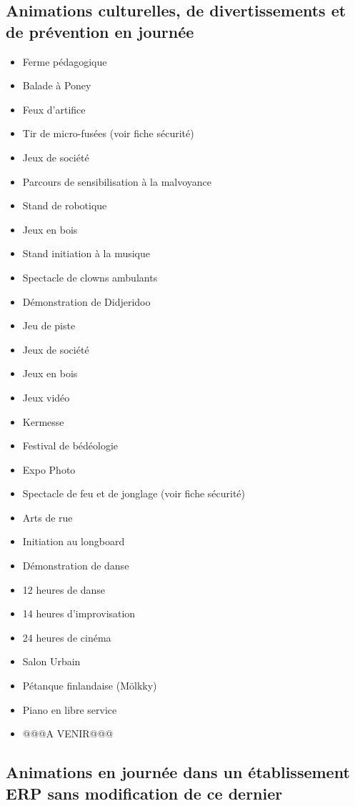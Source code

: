 \documentclass[hidelinks, paper=a4, fontsize=13pt]{report}
\begin{document}
\subsection{Animations culturelles, de divertissements et de prévention en journée}
\begin{itemize}
\item Ferme pédagogique
\item Balade à Poney
\item Feux d'artifice
\item Tir de micro-fusées (voir fiche sécurité)
\item Jeux de société
\item Parcours de sensibilisation à la malvoyance 
\item Stand de robotique
\item Jeux en bois
\item Stand initiation à la musique
\item Spectacle de clowns ambulants
\item Démonstration de Didjeridoo
\item Jeu de piste
\item Jeux de société
\item Jeux en bois
\item Jeux vidéo
\item Kermesse
\item Festival de bédéologie
\item Expo Photo
\item Spectacle de feu et de jonglage (voir fiche sécurité)
\item Arts de rue
\item Initiation au longboard
\item Démonstration de danse
\item 12 heures de danse
\item 14 heures d’improvisation
\item 24 heures de cinéma
\item Salon Urbain
\item Pétanque finlandaise (Mölkky)
\item Piano en libre service
\item @@@A VENIR@@@
\end{itemize}


\subsection{Animations en journée dans un établissement ERP sans modification de ce dernier}
\end{document}
